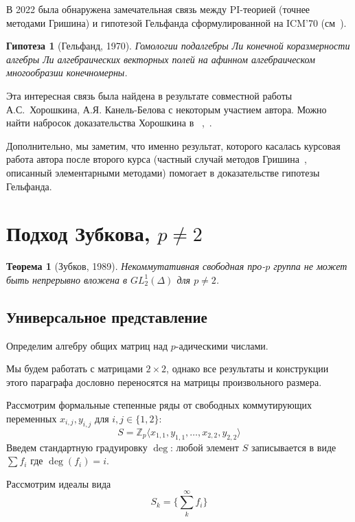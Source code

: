 \documentclass[12pt,a4paper]{article}
\newtheorem{theorem}{Теорема}[section]
\newtheorem{conjecture}{Гипотеза}[section]
\newcommand{\Z}{\ensuremath{\mathbb{Z}}}
\begin{document}
    В 2022 была обнаружена замечательная связь между PI-теорией (точнее методами Гришина) и гипотезой Гельфанда сформулированной на ICM’70 (см\ \cite{Gelfand}).
    \vskip 0.1in\noindent
    \begin{conjecture}[Гельфанд, 1970]
        Гомологии подалгебры Ли конечной коразмерности алгебры Ли алгебраических векторных полей на афинном алгебраическом многообразии конечномерны.
    \end{conjecture}
    \vskip 0.1in\noindent
    Эта интересная связь была найдена в результате совместной работы А.С.\ Хорошкина, А.Я. Канель-Белова с некоторым участием автора.
    Можно найти набросок доказательства Хорошкина в ~\cite{Feigin-Kanel-Khoroshkin},~\cite{Centrone-Kanel-Khoroshkin-Vorobiov}.

    Дополнительно, мы заметим, что именно результат, которого касалась курсовая работа автора после второго курса (частный случай методов Гришина\ \cite{Grishin}, описанный элементарными методами) помогает в доказательстве гипотезы Гельфанда.


    \section{Подход Зубкова, $p\neq2$}
    \begin{theorem}[Зубков, 1989]
        \label{thm:Zubkov-main}
        Некоммутативная свободная про-$p$ группа не может быть непрерывно вложена в $GL^1_2(\Delta)$ для $p\neq 2$.
    \end{theorem}

    \subsection{Универсальное представление}
    Определим алгебру общих матриц над $p$-адическими числами.

    Мы будем работать с матрицами $2\times2$, однако все результаты и конструкции этого параграфа дословно переносятся на матрицы произвольного размера.

    Рассмотрим формальные степенные ряды от свободных коммутирующих переменных $x_{i,j}, y_{i,j}$ для $i,j \in \{ 1, 2 \}$:
    \[
        S = \Z_{p}\langle x_{1,1}, y_{1,1}, \ldots, x_{2,2}, y_{2,2} \rangle
    \]
    Введем стандартную градуировку $\deg$: любой элемент $S$ записывается в виде $\sum f_i$ где $\deg{(f_i)} = i$.

    Рассмотрим идеалы вида
    \[
        S_k = \{\sum\limits_k^{\infty} f_i \}
    \]
\end{document}
